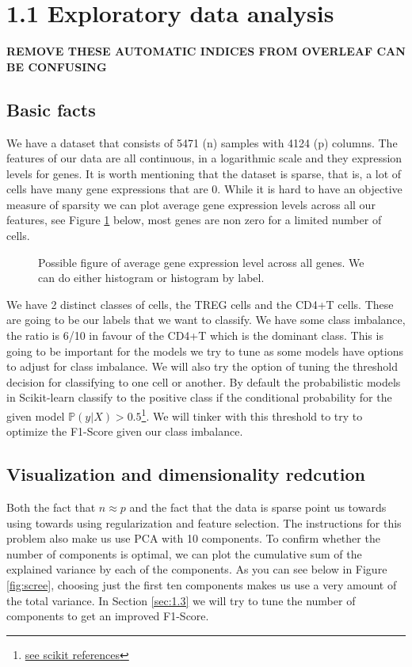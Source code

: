 \documentclass{article}
\begin{document}
\section{1.1 Exploratory data analysis}

\textbf{REMOVE THESE AUTOMATIC INDICES FROM OVERLEAF CAN BE CONFUSING}

\subsection{Basic facts}
We have a dataset that consists of 5471 (n) samples with 4124 (p) columns. The features of our data are all continuous, in a logarithmic scale and they expression levels 
for genes. It is worth mentioning that the dataset is sparse, that is, a lot of cells have many gene expressions that are 0. While it is hard to have an objective measure
of sparsity we can plot average gene expression levels across all our features, see Figure \ref{fig:hist_sparse} below, most genes are non zero for a limited number of cells.

\begin{figure}[h]

    
    \caption{Possible figure of average gene expression level across all genes. We can do either histogram or histogram by label.}\label{fig:hist_sparse}
\end{figure}


We have 2 distinct classes of cells, the TREG cells and the 
CD4+T cells. These are going to be our labels that we want to classify. We have some class imbalance, the ratio is 6/10 in favour of the CD4+T 
which is the dominant class. This is going to be important for the models we try to tune as some models have options to adjust for class imbalance.
We will also try the option of tuning the threshold decision for classifying to one cell or another. By default the probabilistic models in Scikit-learn
classify to the positive class if the conditional probability for the given model $\mathbb{P}(\textit{y}|X) > 0.5$\footnote{\href{https://scikit-learn.org/1.5/modules/classification_threshold.html}{see scikit references}}. 
We will tinker with this threshold to try to optimize the F1-Score given our class imbalance.  

\subsection{Visualization and dimensionality redcution}

Both the fact that $n \approx p$ and the fact that the data is sparse point us towards using towards using regularization and feature selection.
The instructions for this problem also make us use PCA with 10 components. To confirm whether the number of components is optimal, we can plot the cumulative sum of the explained variance by each of the components.
As you can see below in Figure \ref{fig:scree}, choosing just the first ten components makes us use a very amount of the total variance.
In Section \ref{sec:1.3} we will try to tune the number of components to get an improved F1-Score.
\end{document}
